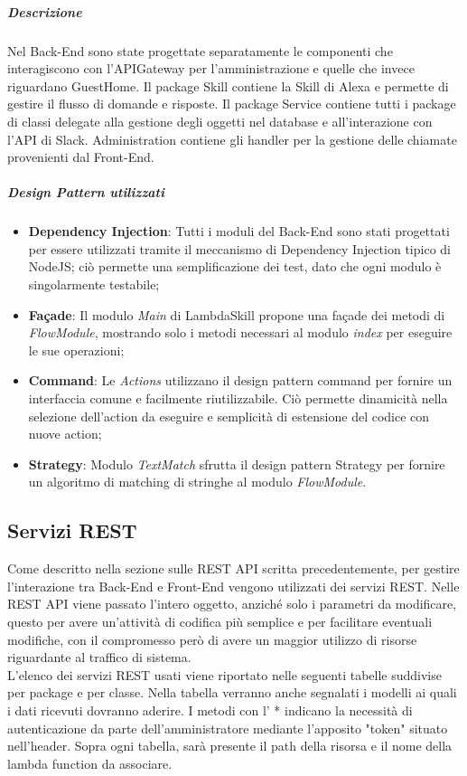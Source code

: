 \documentclass[../DefinizioneDiProdotto_v2.0.0.tex]{subfiles}
\begin{document}
\subparagraph{Descrizione}
Nel Back-End sono state progettate separatamente le componenti che interagiscono con l'APIGateway per l'amministrazione e quelle che invece riguardano GuestHome. Il package Skill contiene la Skill di Alexa e permette di gestire il flusso di domande e risposte. Il package Service contiene tutti i package di classi delegate alla gestione degli oggetti nel database e all'interazione con l'API di Slack. Administration contiene gli handler per la gestione delle chiamate provenienti dal Front-End.

\subparagraph{Design Pattern utilizzati}
\begin{itemize}
	\item \textbf{Dependency Injection}: Tutti i moduli del Back-End sono stati progettati per essere utilizzati tramite il meccanismo di Dependency Injection tipico di NodeJS; ciò permette una semplificazione dei test, dato che ogni modulo è singolarmente testabile;
	\item \textbf{Façade}: Il modulo \textit{Main} di LambdaSkill propone una façade dei metodi di \textit{FlowModule}, mostrando solo i metodi necessari al modulo \textit{index} per eseguire le sue operazioni;
	\item \textbf{Command}: Le \textit{Actions} utilizzano il design pattern command per fornire un interfaccia comune e facilmente riutilizzabile. Ciò permette dinamicità nella selezione dell'action da eseguire e semplicità di estensione del codice con nuove action;
	\item \textbf{Strategy}: Modulo \textit{TextMatch} sfrutta il design pattern Strategy per fornire un algoritmo di matching di stringhe al modulo \textit{FlowModule}.
\end{itemize}


\newpage
\subsection{Servizi REST}
Come descritto nella sezione sulle REST API scritta precedentemente, per
gestire l'interazione tra Back-End e Front-End vengono utilizzati dei servizi REST. Nelle
REST API viene passato l'intero oggetto, anziché solo i parametri da modificare, questo
per avere un'attività di codifica più semplice e per facilitare eventuali modifiche, con il
compromesso però di avere un maggior utilizzo di risorse riguardante al traffico di sistema.\\
L'elenco dei servizi REST usati viene riportato nelle seguenti tabelle suddivise per package e per classe.
Nella tabella verranno anche segnalati i modelli ai quali i dati ricevuti dovranno aderire.
I metodi con l' * indicano la necessità di autenticazione da parte dell'amministratore mediante l'apposito "token" situato nell'header.
Sopra ogni tabella, sarà presente il path della risorsa e il nome della lambda function da associare.
\end{document}
